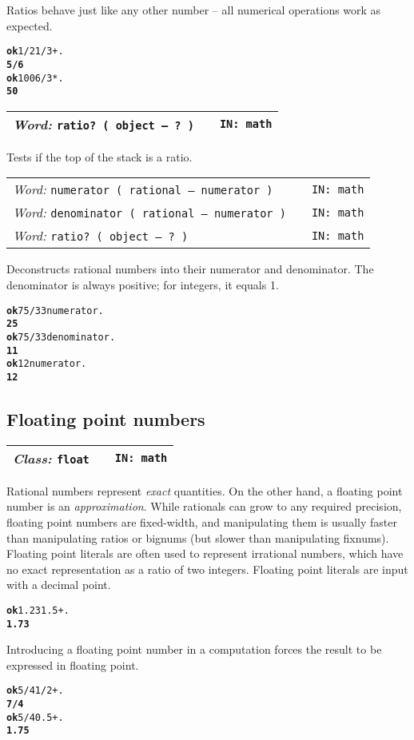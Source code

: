 \documentclass{report}
\newcommand{\ordinaryword}[3]{\index{#1}
\emph{Word:} \texttt{#2} &&\texttt{IN: #3}}
\newcommand{\classword}[2]{\index{#1}
\emph{Class:} \texttt{#1} &&\texttt{IN: #2}}
\newcommand{\predword}[2]{\ordinaryword{#1}{#1~( object -- ?~)}{#2}}
\newcommand{\wordtable}[1]{

\begin{tabularx}{12cm}[t]{lXr}
\hline
#1\\
\hline
\end{tabularx}

}
\begin{document}
Ratios behave just like any other number -- all numerical operations work as expected.
\begin{alltt}
\textbf{ok} 1/2 1/3 + .
\textbf{5/6}
\textbf{ok} 100 6 / 3 * .
\textbf{50}
\end{alltt}
\wordtable{
\predword{ratio?}{math}
}
Tests if the top of the stack is a ratio.
\wordtable{
\ordinaryword{numerator}{numerator ( rational -- numerator )}{math}\\
\ordinaryword{denominator}{denominator ( rational -- numerator )}{math}\\
\predword{ratio?}{math}
}
Deconstructs rational numbers into their numerator and denominator. The denominator is always positive; for integers, it equals 1.
\begin{alltt}
\textbf{ok} 75/33 numerator .
\textbf{25}
\textbf{ok} 75/33 denominator .
\textbf{11}
\textbf{ok} 12 numerator .
\textbf{12}
\end{alltt}

\subsection{\label{floats}Floating point numbers}

\wordtable{
\classword{float}{math}
}
\newcommand{\realglos}{}
\realglos
\floatglos

Rational numbers represent \emph{exact} quantities. On the other hand, a floating point number is an \emph{approximation}. While rationals can grow to any required precision, floating point numbers are fixed-width, and manipulating them is usually faster than manipulating ratios or bignums (but slower than manipulating fixnums). Floating point literals are often used to represent irrational numbers, which have no exact representation as a ratio of two integers. Floating point literals are input with a decimal point.

\begin{alltt}
\textbf{ok} 1.23 1.5 + .
\textbf{1.73}
\end{alltt}

Introducing a floating point number in a computation forces the result to be expressed in floating point.

\begin{alltt}
\textbf{ok} 5/4 1/2 + .
\textbf{7/4}
\textbf{ok} 5/4 0.5 + .
\textbf{1.75}
\end{alltt}
\end{document}
